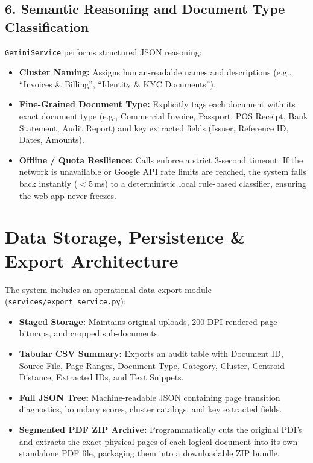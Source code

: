 \documentclass[11pt,a4paper]{article}
\begin{document}
\subsection{6. Semantic Reasoning and Document Type Classification}
\texttt{GeminiService} performs structured JSON reasoning:
\begin{itemize}[leftmargin=*, noitemsep]
    \item \textbf{Cluster Naming:} Assigns human-readable names and descriptions (e.g., ``Invoices \& Billing'', ``Identity \& KYC Documents'').
    \item \textbf{Fine-Grained Document Type:} Explicitly tags each document with its exact document type (e.g., Commercial Invoice, Passport, POS Receipt, Bank Statement, Audit Report) and key extracted fields (Issuer, Reference ID, Dates, Amounts).
    \item \textbf{Offline / Quota Resilience:} Calls enforce a strict 3-second timeout. If the network is unavailable or Google API rate limits are reached, the system falls back instantly ($< 5\,$ms) to a deterministic local rule-based classifier, ensuring the web app never freezes.
\end{itemize}

\section{Data Storage, Persistence \& Export Architecture}
The system includes an operational data export module (\texttt{services/export\_service.py}):
\begin{itemize}[leftmargin=*, noitemsep]
    \item \textbf{Staged Storage:} Maintains original uploads, 200 DPI rendered page bitmaps, and cropped sub-documents.
    \item \textbf{Tabular CSV Summary:} Exports an audit table with Document ID, Source File, Page Ranges, Document Type, Category, Cluster, Centroid Distance, Extracted IDs, and Text Snippets.
    \item \textbf{Full JSON Tree:} Machine-readable JSON containing page transition diagnostics, boundary scores, cluster catalogs, and key extracted fields.
    \item \textbf{Segmented PDF ZIP Archive:} Programmatically cuts the original PDFs and extracts the exact physical pages of each logical document into its own standalone PDF file, packaging them into a downloadable ZIP bundle.
\end{itemize}
\end{document}
